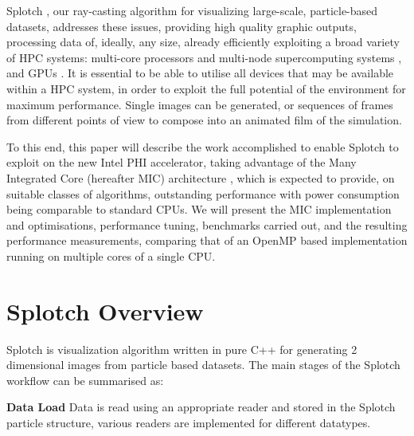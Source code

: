 \documentclass[runningheads,a4paper]{llncs}
\begin{document}
Splotch \cite{splotch}, our ray-casting algorithm for visualizing large-scale, particle-based datasets, addresses these issues, 
providing high quality graphic outputs, processing data of, ideally, any size, already efficiently exploiting a broad 
variety of HPC systems: multi-core processors and multi-node supercomputing systems \cite{splotchmulti}, and GPUs \cite{splotchgpu}. 
It is essential to be able to utilise all devices that may be available within a HPC system, in order to exploit the full 
potential of the environment for maximum performance. Single images can be generated, or sequences of frames from 
different points of view to compose into an animated film of the simulation.

To this end, this paper will describe the work accomplished to enable Splotch to exploit on the new Intel PHI \cite{xeonphi} 
accelerator, taking advantage of the Many Integrated Core (hereafter MIC) architecture \cite{mic}, which is expected to provide, 
on suitable classes of algorithms, outstanding performance with power consumption being comparable to standard CPUs. 
We will present the MIC implementation and optimisations, performance tuning, benchmarks carried out, and the resulting 
performance measurements, comparing that of an OpenMP based implementation running on multiple cores of a single CPU. 

\section{Splotch Overview}
\label{sect:overview}


Splotch is visualization algorithm written in pure C++ for generating 2 dimensional images from particle based datasets. 
The main stages of the Splotch workflow can be summarised as:

\vskip 1pc
\noindent
\textbf{Data Load}
  Data is read using an appropriate reader and stored in the Splotch particle structure, various readers are 
  implemented for different datatypes.
  
\end{document}
